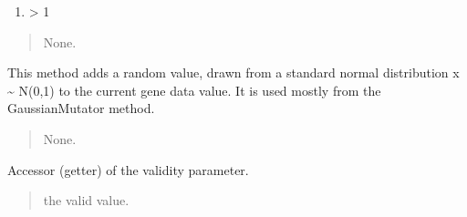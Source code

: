 \documentclass[letterpaper,10pt,english]{sphinxmanual}
\begin{document}
\begin{fulllineitems}
\begin{fulllineitems}
\begin{enumerate}
\end{enumerate}
\begin{enumerate}
%
\setcounter{enumi}{1}
\item {} 
 \sphinxhyphen{}\textgreater{} 1

\end{enumerate}
\begin{quote}\begin{description}
\sphinxAtStartPar
None.

\end{description}\end{quote}

\end{fulllineitems}


\begin{fulllineitems}
\label{\detokenize{pygenalgo.genome:pygenalgo.genome.gene.Gene.gaussian}}
\pysigstartsignatures
{}
\pysigstopsignatures
\sphinxAtStartPar
This method adds a random value, drawn from a standard normal
distribution x \textasciitilde{} N(0,1) to the current gene data value. It is
used mostly from the GaussianMutator method.
\begin{quote}\begin{description}
\sphinxAtStartPar
None.

\end{description}\end{quote}

\end{fulllineitems}


\begin{fulllineitems}
\label{\detokenize{pygenalgo.genome:pygenalgo.genome.gene.Gene.is_valid}}
\pysigstartsignatures
{}
\pysigstopsignatures
\sphinxAtStartPar
Accessor (getter) of the validity parameter.
\begin{quote}\begin{description}
\sphinxAtStartPar
the valid value.


\end{description}
\end{quote}
\end{fulllineitems}
\end{fulllineitems}
\end{document}
